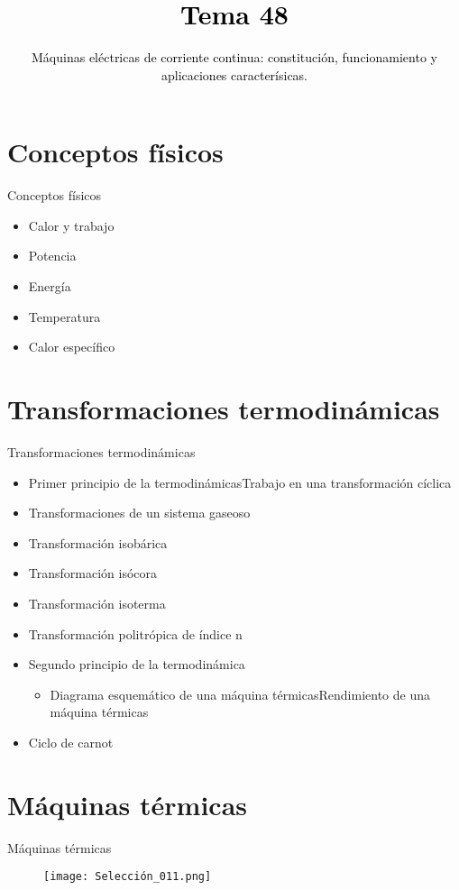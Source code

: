 \documentclass{beamer}
\title{\textcolor{black}{Tema 48}}
\subtitle{\textcolor{black}{Máquinas eléctricas de corriente continua: constitución, funcionamiento y aplicaciones caracterísicas.}}
\begin{document}
\begin{frame}[plain,t]
\titlepage
\end{frame}



\section{Conceptos físicos}
\begin{frame}{Conceptos físicos}
    \begin{itemize}
        \item Calor y trabajo
        \item Potencia
        \item Energía
        \item Temperatura
        \item Calor específico
    \end{itemize}
  
\end{frame}

\section{Transformaciones termodinámicas}
\begin{frame}{Transformaciones termodinámicas}
    \begin{itemize}
        \item Primer principio de la termodinámicasTrabajo en una transformación cíclica
        \item Transformaciones de un sistema gaseoso
        \item Transformación isobárica
        \item Transformación isócora
        \item Transformación isoterma
        \item Transformación politrópica de índice n
        \item Segundo principio de la termodinámica
        \begin{itemize}
            \item Diagrama esquemático de una máquina térmicasRendimiento de una máquina térmicas
        \end{itemize}
        \item Ciclo de carnot
    \end{itemize}
\end{frame}


\section{Máquinas térmicas}
\begin{frame}{Máquinas térmicas}
    \begin{figure}[h]
        \texttt{[image: Selección\_011.png]}
        \end{figure}
\end{frame}
\end{document}
